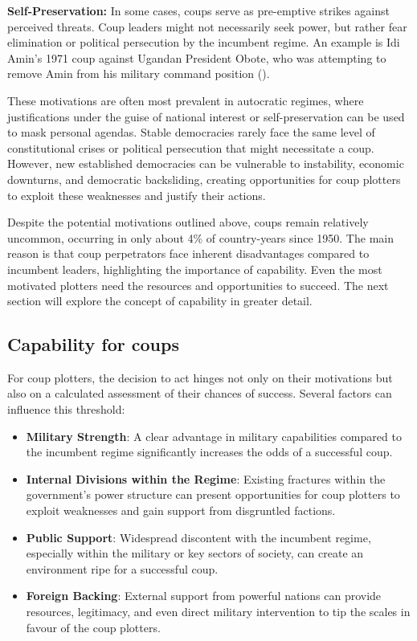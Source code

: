 \documentclass[
  12pt,
]{report}
\begin{document}
\textbf{Self-Preservation:} In some cases, coups serve as pre-emptive
strikes against perceived threats. Coup leaders might not necessarily
seek power, but rather fear elimination or political persecution by the
incumbent regime. An example is Idi Amin's 1971 coup against Ugandan
President Obote, who was attempting to remove Amin from his military
command position ().

These motivations are often most prevalent in autocratic regimes, where
justifications under the guise of national interest or self-preservation
can be used to mask personal agendas. Stable democracies rarely face the
same level of constitutional crises or political persecution that might
necessitate a coup. However, new established democracies can be
vulnerable to instability, economic downturns, and democratic
backsliding, creating opportunities for coup plotters to exploit these
weaknesses and justify their actions.

Despite the potential motivations outlined above, coups remain
relatively uncommon, occurring in only about 4\% of country-years since
1950. The main reason is that coup perpetrators face inherent
disadvantages compared to incumbent leaders, highlighting the importance
of capability. Even the most motivated plotters need the resources and
opportunities to succeed. The next section will explore the concept of
capability in greater detail.

\subsection{Capability for coups}\label{capability-for-coups}

For coup plotters, the decision to act hinges not only on their
motivations but also on a calculated assessment of their chances of
success. Several factors can influence this threshold:

\begin{itemize}
\item
  \textbf{Military Strength}: A clear advantage in military capabilities
  compared to the incumbent regime significantly increases the odds of a
  successful coup.
\item
  \textbf{Internal Divisions within the Regime}: Existing fractures
  within the government's power structure can present opportunities for
  coup plotters to exploit weaknesses and gain support from disgruntled
  factions.
\item
  \textbf{Public Support}: Widespread discontent with the incumbent
  regime, especially within the military or key sectors of society, can
  create an environment ripe for a successful coup.
\item
  \textbf{Foreign Backing}: External support from powerful nations can
  provide resources, legitimacy, and even direct military intervention
  to tip the scales in favour of the coup plotters.
\end{itemize}
\end{document}
